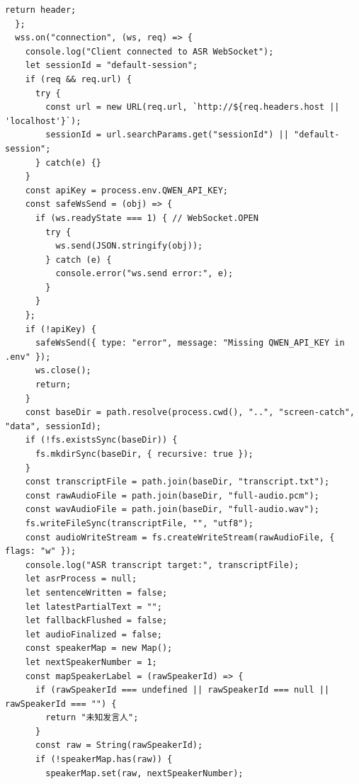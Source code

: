 \documentclass[12pt,a4paper]{article}
\begin{document}
\begin{Verbatim}[fontsize=\footnotesize]
    return header;
  };
  wss.on("connection", (ws, req) => {
    console.log("Client connected to ASR WebSocket");
    let sessionId = "default-session";
    if (req && req.url) {
      try {
        const url = new URL(req.url, `http://${req.headers.host || 'localhost'}`);
        sessionId = url.searchParams.get("sessionId") || "default-session";
      } catch(e) {}
    }
    const apiKey = process.env.QWEN_API_KEY;
    const safeWsSend = (obj) => {
      if (ws.readyState === 1) { // WebSocket.OPEN
        try {
          ws.send(JSON.stringify(obj));
        } catch (e) {
          console.error("ws.send error:", e);
        }
      }
    };
    if (!apiKey) {
      safeWsSend({ type: "error", message: "Missing QWEN_API_KEY in .env" });
      ws.close();
      return;
    }
    const baseDir = path.resolve(process.cwd(), "..", "screen-catch", "data", sessionId);
    if (!fs.existsSync(baseDir)) {
      fs.mkdirSync(baseDir, { recursive: true });
    }
    const transcriptFile = path.join(baseDir, "transcript.txt");
    const rawAudioFile = path.join(baseDir, "full-audio.pcm");
    const wavAudioFile = path.join(baseDir, "full-audio.wav");
    fs.writeFileSync(transcriptFile, "", "utf8");
    const audioWriteStream = fs.createWriteStream(rawAudioFile, { flags: "w" });
    console.log("ASR transcript target:", transcriptFile);
    let asrProcess = null;
    let sentenceWritten = false;
    let latestPartialText = "";
    let fallbackFlushed = false;
    let audioFinalized = false;
    const speakerMap = new Map();
    let nextSpeakerNumber = 1;
    const mapSpeakerLabel = (rawSpeakerId) => {
      if (rawSpeakerId === undefined || rawSpeakerId === null || rawSpeakerId === "") {
        return "未知发言人";
      }
      const raw = String(rawSpeakerId);
      if (!speakerMap.has(raw)) {
        speakerMap.set(raw, nextSpeakerNumber);
\end{Verbatim}
\newpage
{}
\fancyhead[R]{}
\end{document}
